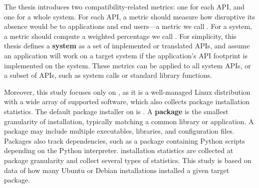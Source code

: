 
The thesis introduces two compatibility-related metrics: one for each API, and one for a whole system.
For each API, a metric should measure how disruptive its absence
would be to applications and end users---a metric we call {\bf  \usagemetric{}}.
For a system, a metric should compute a weighted percentage we call {\bf \compatmetric{}}. 
For simplicity, this thesis defines a {\bf system} as a set of implemented or translated APIs,
and assume an 
application will work on a target system if the application's API footprint is implemented on the system.
These metrics can be applied to all system APIs,
or a subset of APIs,
such as system calls 
or standard library functions.



Moreover, this study focuses only on \osdist{}, as it is a well-managed Linux distribution with a wide array of 
supported software, which also collects
package installation statistics.
The default package installer on \osdist{} is \osinstaller{}.
A {\bf package} is the smallest granularity of installation, typically
matching a common library or application.
A package may include
multiple executables, libraries, and configuration files.
Packages also track dependencies, such as a package containing 
Python scripts depending on the Python interpreter.
\osdist{} installation statistics are collected at package granularity
and collect several types of statistics.
This study is based on
data of how many
Ubuntu or Debian installations
installed a given target package.

